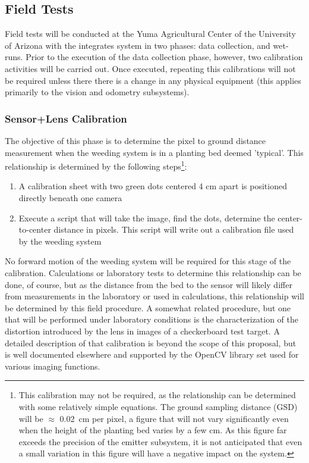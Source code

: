 \documentclass[12pt]{article}
\begin{document}
\subsection{Field Tests}
Field tests will be conducted at the Yuma Agricultural Center of the University of Arizona with the integrates system in two phases: data collection, and wet-runs. Prior to the execution of the data collection phase, however, two calibration activities will be carried out. Once executed, repeating this calibrations will not be required unless there there is a change in any physical equipment (this applies primarily to the vision and odometry subsystems).
\subsubsection{Sensor+Lens Calibration}
The objective of this phase is to determine the pixel to ground distance measurement when the weeding system is in a planting bed deemed 'typical'. This relationship is determined by the following steps\footnote{This calibration may not be required, as the relationship can be determined with some relatively simple equations. The ground sampling distance (GSD) will be $\approx$ \SI{0.02} {\centi\meter} per pixel, a figure that will not vary significantly even when the height of the planting bed varies by a few cm. As this figure far exceeds the precision of the emitter subsystem, it is not anticipated that even a small variation in this figure will have a negative impact on the system.}:
\begin{enumerate}
	\item{A calibration sheet with two green dots centered 4 cm apart is positioned directly beneath one camera}
	\item{Execute a script that will take the image, find the dots, determine the center-to-center distance in pixels. This script will write out a calibration file used by the weeding system}
\end{enumerate}
No forward motion of the weeding system will be required for this stage of the calibration. Calculations or laboratory tests to determine this relationship can be done, of course, but as the distance from the bed to the sensor will likely differ from measurements in the laboratory or used in calculations, this relationship will be determined by this field procedure.  A somewhat related procedure, but one that will be performed under laboratory conditions is the characterization of the distortion introduced by the lens in images of a checkerboard test target. A detailed description of that calibration is beyond the scope of this proposal, but is well documented elsewhere and supported by the OpenCV library set used for various imaging functions.
\end{document}
